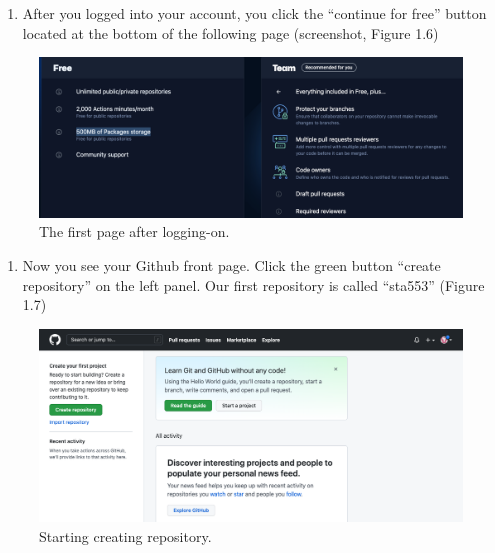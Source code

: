 \documentclass[
]{book}
\providecommand{\tightlist}{%
  \setlength{\itemsep}{0pt}\setlength{\parskip}{0pt}}
\begin{document}
\begin{enumerate}
\def\labelenumi{\arabic{enumi}.}
\tightlist
\item
  After you logged into your account, you click the ``continue for free'' button located at the bottom of the following page (screenshot, Figure 1.6)
\end{enumerate}

\begin{figure}

{\centering \includegraphics[width=0.9\linewidth]{img00/FreeGithub} 

}

\caption{The first page after logging-on.}\label{fig:unnamed-chunk-12}
\end{figure}

\begin{enumerate}
\def\labelenumi{\arabic{enumi}.}
\setcounter{enumi}{1}
\tightlist
\item
  Now you see your Github front page. Click the green button ``create repository'' on the left panel. Our first repository is called ``sta553'' (Figure 1.7)
\end{enumerate}

\begin{figure}

{\centering \includegraphics[width=0.9\linewidth]{img00/GithubFrontPage} 

}

\caption{Starting creating repository.}\label{fig:unnamed-chunk-13}
\end{figure}
\end{document}
